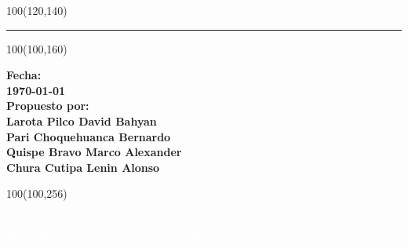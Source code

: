 \begin{titlepage}
    \begin{textblock}{100}(120,140)
        \textcolor{azulm}{\rule{0.5\linewidth}{0.90mm}} \par
    \end{textblock}
    
    \begin{textblock}{100}(100,160)
        \begin{flushright}
            {\large{\textbf{Fecha: \\[10pt] \today}}}\\[15pt]
            {\large{\textbf{ Propuesto por: }}}\\[5pt]
            {\large{\textbf{ Larota Pilco David Bahyan }}}\\[5pt]
            {\large{\textbf{ Pari Choquehuanca Bernardo }}}\\[5pt]
            {\large{\textbf{ Quispe Bravo Marco Alexander }}}\\[5pt]
            {\large{\textbf{ Chura Cutipa Lenin Alonso }}}\\[5pt]
        \end{flushright} 
    \end{textblock}

    \begin{textblock}{100}(100,256)
        \begin{flushright}
            {\huge{\textcolor{white}{Universidad Nacional del Altiplano}}}\\
            {\normalsize{\textcolor{white}{Educando mentes, Cambiando el mundo}}}
        
        \end{flushright} 
    \end{textblock}

\end{titlepage}